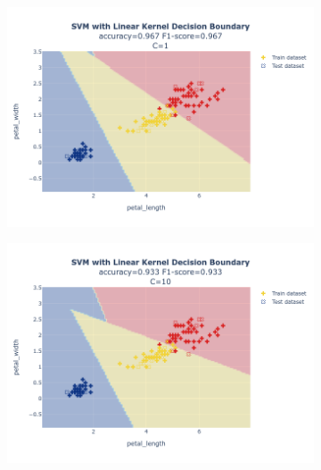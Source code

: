 \documentclass{article}
\begin{document}
\begin{figure}
\begin{subfigure}{0.3\textwidth}
        \includegraphics[scale=.13]{images/implementation/q1/linear_kernel/petal_length_petal_width_1.png}
    \end{subfigure}
    \newline
    \begin{subfigure}{0.3\textwidth}
        \centering
        \includegraphics[scale=.13]{images/implementation/q1/linear_kernel/petal_length_petal_width_10.png}
    \end{subfigure}
    \hfill
    \begin{subfigure}{0.3\textwidth}
        \centering

\end{subfigure}
\end{figure}
\end{document}
